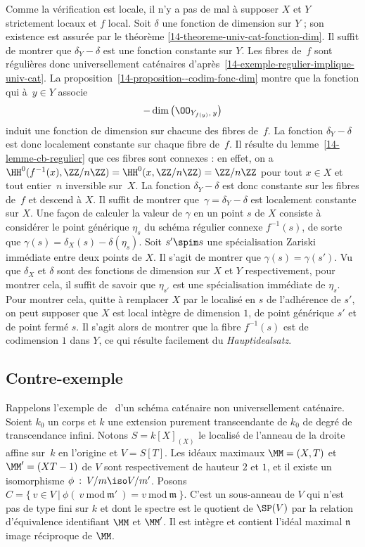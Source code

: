 \documentclass[10pt]{../fichiers-configuration-latex/smfart}
\begin{document}
\begin{démo} Comme la vérification est locale, il n'y a pas de mal à supposer $X$ et $Y$ strictement
locaux et $f$ local. Soit $\delta$ une fonction de dimension sur $Y$ ; son existence est assurée par
le théorème \ref{14-theoreme-univ-cat-fonction-dim}. Il suffit de montrer que $\delta_Y-\delta$ est
une fonction constante sur $Y$. Les fibres de~$f$ sont  régulières donc universellement caténaires
d'après~\ref{14-exemple-regulier-implique-univ-cat}. La
proposition~\ref{14-proposition--codim-fonc-dim} montre que la fonction qui à~$y\in Y$ associe  $$-
\dim \left( \OO_{Y_{f(y)},\: y} \right) $$ induit une fonction de dimension sur chacune des fibres
de~$f$. La fonction $\delta_Y-\delta$ est donc localement constante sur chaque fibre de~$f$. Il
résulte du lemme~\ref{14-lemme-cb-regulier} que ces fibres sont connexes : en effet, on a
$\HH^0(f^{-1}(x),\ZZ/n\ZZ)=\HH^0(x,\ZZ/n\ZZ)=\ZZ/n\ZZ$ pour tout $x\in X$ et tout entier~$n$
inversible sur~$X$. La fonction $\delta_Y-\delta$ est donc constante sur les fibres de~$f$ et
descend à $X$. Il suffit de montrer que~$\gamma=\delta_Y-\delta$ est localement constante sur $X$.
Une façon de calculer la valeur de $\gamma$ en un point $s$ de $X$ consiste à considérer le point
générique $\eta_s$ du schéma régulier connexe $f^{-1}(s)$, de sorte que
$\gamma(s)=\delta_X(s)-\delta(\eta_s)$. Soit $s' \spim s$ une spécialisation Zariski immédiate entre
deux points de $X$. Il s'agit de montrer que $\gamma(s)=\gamma(s')$. Vu que $\delta_X$ et $\delta$
sont des fonctions de dimension sur $X$ et $Y$ respectivement, pour montrer cela, il suffit de
savoir que $\eta_{s'}$ est une spécialisation immédiate de $\eta_s$. Pour montrer cela, quitte à
remplacer $X$ par le localisé en $s$ de l'adhérence de $s'$, on peut supposer que $X$ est local
intègre de dimension $1$, de point générique $s'$ et de point fermé $s$. Il s'agit alors de montrer
que la fibre $f^{-1}(s)$ est de codimension $1$ dans $Y$, ce qui résulte facilement du
\emph{Hauptidealsatz}.  \end{démo}

\subsection{Contre-exemple}

Rappelons l'exemple de~ d'un schéma caténaire non universellement caténaire.  Soient
$k_0$ un corps et $k$ une extension purement transcendante de $k_0$  de degré de transcendance
infini. Notons $S=k[X]_{(X)}$ le localisé de l'anneau de la droite affine sur~$k$ en l'origine et
$V=S[T]$. Les idéaux maximaux $\MM=(X,T)$ et $\MM'=(XT-1)$ de $V$ sont respectivement de hauteur $2$
et $1$, et il existe un isomorphisme $\phi \: : \: V/\mathfrak{m} \iso V/\mathfrak{m}'$. Posons
$C=\{\:v\in V \: | \: \phi(\: v \: \mathrm{mod} \: \mathfrak{m}'\:) = v \: \mathrm{mod} \:
\mathfrak{m} \:\}$. C'est un sous-anneau de $V$ qui n'est pas de type fini sur $k$ et dont le
spectre est le quotient de $\SP(V)$ par la relation d'équivalence identifiant $\MM$ et $\MM'$. Il
est intègre et contient l'idéal maximal $\mathfrak{n}$ image réciproque de $\MM$.
\end{document}
